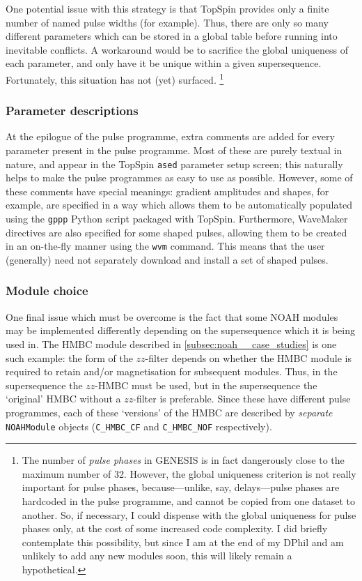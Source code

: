 One potential issue with this strategy is that TopSpin provides only a finite number of named pulse widths (for example).
Thus, there are only so many different parameters which can be stored in a global table before running into inevitable conflicts.
A workaround would be to sacrifice the global uniqueness of each parameter, and only have it be unique within a given supersequence.
Fortunately, this situation has not (yet) surfaced.%
\footnote{The number of \textit{pulse phases} in GENESIS is in fact dangerously close to the maximum number of 32. However, the global uniqueness criterion is not really important for pulse phases, because---unlike, say, delays---pulse phases are hardcoded in the pulse programme, and cannot be copied from one dataset to another. So, if necessary, I could dispense with the global uniqueness for pulse phases only, at the cost of some increased code complexity. I did briefly contemplate this possibility, but since I am at the end of my DPhil and am unlikely to add any new modules soon, this will likely remain a hypothetical.}


\subsubsection{Parameter descriptions}

At the epilogue of the pulse programme, extra comments are added for every parameter present in the pulse programme.
Most of these are purely textual in nature, and appear in the TopSpin \texttt{ased} parameter setup screen; this naturally helps to make the pulse programmes as easy to use as possible.
However, some of these comments have special meanings: gradient amplitudes and shapes, for example, are specified in a way which allows them to be automatically populated using the \texttt{gppp} Python script packaged with TopSpin.
Furthermore, WaveMaker directives are also specified for some shaped pulses, allowing them to be created in an on-the-fly manner using the \texttt{wvm} command.
This means that the user (generally) need not separately download and install a set of shaped pulses.

\subsubsection{Module choice}

One final issue which must be overcome is the fact that some NOAH modules may be implemented differently depending on the supersequence which it is being used in.
The HMBC module described in \cref{subsec:noah__case_studies} is one such example: the form of the $zz$-filter depends on whether the HMBC module is required to retain  and/or  magnetisation for subsequent modules.
Thus, in the  supersequence the $zz$-HMBC must be used, but in the  supersequence the `original' HMBC without a $zz$-filter is preferable.
Since these have different pulse programmes, each of these `versions' of the HMBC are described by \textit{separate} \texttt{NOAHModule} objects (\texttt{C\_HMBC\_CF} and \texttt{C\_HMBC\_NOF} respectively).

